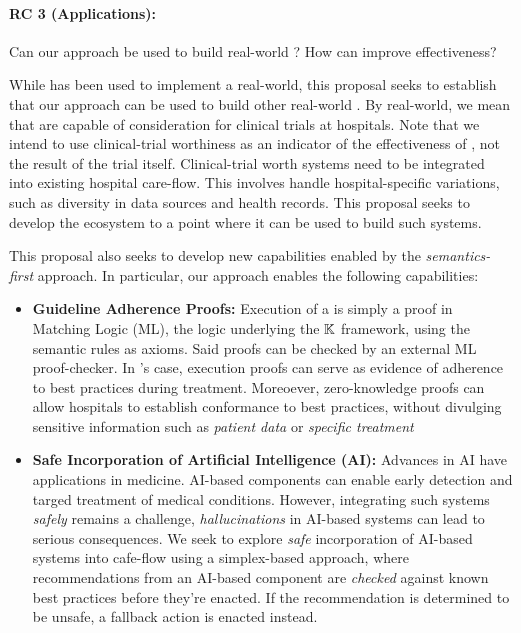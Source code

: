 \paragraph{RC 3 (Applications):} Can our approach be used to build real-world
\CDSSs{}? How can \MediK{} improve \CDSSs{} effectiveness?

While \MediK{} has been used to implement a real-world,
this proposal seeks to establish that our approach can be used to build
other real-world \CDSSs{}. By real-world, we mean \CDSSs{} that are
capable of consideration for clinical trials at hospitals. Note that we
intend to use clinical-trial worthiness as an indicator of the effectiveness
of \MediK{}, not the result of the trial itself.
Clinical-trial worth systems need to be integrated into existing hospital care-flow.
This involves handle hospital-specific variations, such as
diversity in data sources and health records. This proposal seeks to
develop the \MediK{} ecosystem to a point where it can be used to build
such systems.

This proposal also seeks to develop new \CDSS{} capabilities enabled by the
\emph{semantics-first} approach. In particular, our approach
enables the following capabilities:

\begin{itemize}
  \item \textbf{Guideline Adherence Proofs:} Execution of a
\MediK{} \BPG{} is simply a proof in Matching Logic (ML), the logic
underlying the $\mathbb{K}{}$ framework, using the semantic rules as axioms.
Said proofs can be checked by an external ML proof-checker.
In \MediK{}'s case, execution proofs can serve as evidence of adherence to best practices during treatment.
Moreoever, zero-knowledge proofs can allow hospitals to establish
conformance to best practices, without divulging sensitive information
such as \emph{patient data} or \emph{specific treatment}
  \item \textbf{Safe Incorporation of Artificial Intelligence (AI):}
Advances in AI have applications in medicine. AI-based components
can enable early detection and targed treatment of medical conditions.
However, integrating such systems \emph{safely} remains a challenge,
\emph{hallucinations} in AI-based systems can lead to serious consequences.
We seek to explore \emph{safe} incorporation of AI-based systems into cafe-flow using
a simplex-based approach, where recommendations from an AI-based component are
\emph{checked} against known best practices before they're enacted.
If the recommendation is determined to be unsafe, a fallback action is enacted
instead.
\end{itemize}

